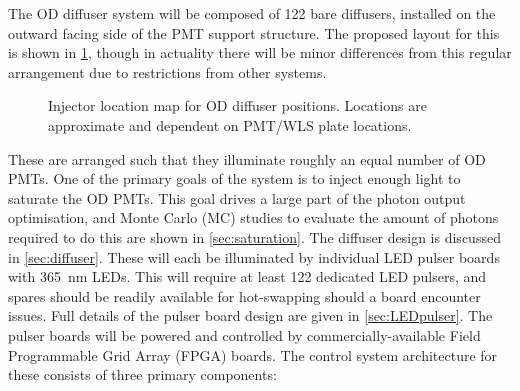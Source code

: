 \documentclass[a4paper,11pt]{article}
\begin{document}
The OD diffuser system will be composed of 122 bare diffusers, installed on the outward facing side of the PMT support structure. The proposed layout for this is shown in \cref{fig:ODdiffmap}, though in actuality there will be minor differences from this regular arrangement due to restrictions from other systems.
\begin{figure}[h!]
\centering
{}
\caption{Injector location map for OD diffuser positions. Locations are approximate and dependent on PMT/WLS plate locations.}\label{fig:ODdiffmap}
\end{figure}
These are arranged such that they illuminate roughly an equal number of OD PMTs. One of the primary goals of the system is to inject enough light to saturate the OD PMTs. This goal drives a large part of the photon output optimisation, and Monte Carlo (MC) studies to evaluate the amount of photons required to do this are shown in \cref{sec:saturation}. The diffuser design is discussed in \cref{sec:diffuser}. These will each be illuminated by individual LED pulser boards with 365~nm LEDs. This will require at least 122 dedicated LED pulsers, and spares should be readily available for hot-swapping should a board encounter issues. Full details of the pulser board design are given in \cref{sec:LEDpulser}. The pulser boards will be powered and controlled by commercially-available Field Programmable Grid Array (FPGA) boards. The control system architecture for these consists of three primary components:
\end{document}
